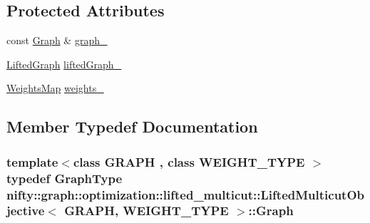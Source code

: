 \subsection*{Protected Attributes}
\begin{DoxyCompactItemize}
\item 
const \hyperlink{classnifty_1_1graph_1_1optimization_1_1lifted__multicut_1_1LiftedMulticutObjective_ad424be985627898c8af930ebc7c776f9}{Graph} \& \hyperlink{classnifty_1_1graph_1_1optimization_1_1lifted__multicut_1_1LiftedMulticutObjective_a77cf2b54b24591850355f383fa66fc9a}{graph\+\_\+}
\item 
\hyperlink{classnifty_1_1graph_1_1optimization_1_1lifted__multicut_1_1LiftedMulticutObjective_a3d3e69a6bc8de9a85497c8e4a1620815}{Lifted\+Graph} \hyperlink{classnifty_1_1graph_1_1optimization_1_1lifted__multicut_1_1LiftedMulticutObjective_a8acce81832827e80a0b11bad67773a1f}{lifted\+Graph\+\_\+}
\item 
\hyperlink{classnifty_1_1graph_1_1optimization_1_1lifted__multicut_1_1LiftedMulticutObjective_a95340316f33714f1206080ff0e425f56}{Weights\+Map} \hyperlink{classnifty_1_1graph_1_1optimization_1_1lifted__multicut_1_1LiftedMulticutObjective_af5a2a0c62151d1e838995fae929e8a46}{weights\+\_\+}
\end{DoxyCompactItemize}


\subsection{Member Typedef Documentation}
\hypertarget{classnifty_1_1graph_1_1optimization_1_1lifted__multicut_1_1LiftedMulticutObjective_ad424be985627898c8af930ebc7c776f9}{}
\subsubsection[{Graph}]{\setlength{\rightskip}{0pt plus 5cm}template$<$class G\+R\+A\+P\+H , class W\+E\+I\+G\+H\+T\+\_\+\+T\+Y\+P\+E $>$ typedef {\bf Graph\+Type} {\bf nifty\+::graph\+::optimization\+::lifted\+\_\+multicut\+::\+Lifted\+Multicut\+Objective}$<$ G\+R\+A\+P\+H, W\+E\+I\+G\+H\+T\+\_\+\+T\+Y\+P\+E $>$\+::{\bf Graph}}\label{classnifty_1_1graph_1_1optimization_1_1lifted__multicut_1_1LiftedMulticutObjective_ad424be985627898c8af930ebc7c776f9}
\hypertarget{classnifty_1_1graph_1_1optimization_1_1lifted__multicut_1_1LiftedMulticutObjective_aefbd1898d3e4460d998f6116505adef0}{}
